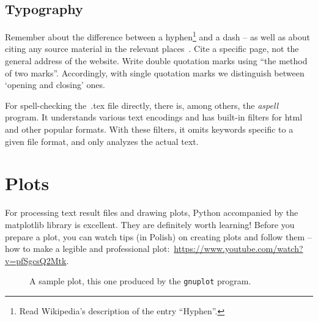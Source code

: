 \documentclass{article}
\begin{document}
\subsection{Typography}
\label{sec:typografia}

Remember about the difference between a hyphen\footnote{Read Wikipedia's description of the entry ``Hyphen''.} and a dash -- as well as about citing any source material in the relevant places~\cite{WikiDash}. Cite a specific page, not the general address of the website. Write double quotation marks using ``the method of two marks''. Accordingly, with single quotation marks we distinguish between `opening and closing' ones.

For spell-checking the\ .tex file directly, there is, among others, the \emph{aspell} program. It understands various text encodings and has built-in filters for html and other popular formats. With these filters, it omits keywords specific to a given file format, and only analyzes the actual text. %







\section{Plots}

\noindent For processing text result files and drawing plots, Python accompanied by the matplotlib library is excellent. They are definitely worth learning! Before you prepare a plot, you can watch tips (in Polish) on creating plots and follow them -- how to make a legible and professional plot:~\url{https://www.youtube.com/watch?v=pfSgcsQ2Mtk}. %


\begin{figure}
\begin{center}
\end{center}
\caption{A sample plot, this one produced by the \texttt{gnuplot} program.}
\label{fig:3d}
\end{figure}
\end{document}
